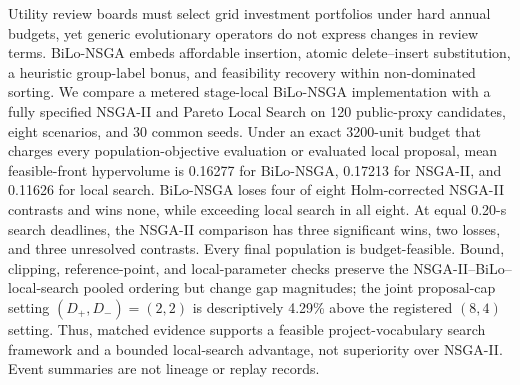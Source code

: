 Utility review boards must select grid investment portfolios under hard annual budgets, yet generic evolutionary operators do not express changes in review terms. BiLo-NSGA embeds affordable insertion, atomic delete--insert substitution, a heuristic group-label bonus, and feasibility recovery within non-dominated sorting. We compare a metered stage-local BiLo-NSGA implementation with a fully specified NSGA-II and Pareto Local Search on 120 public-proxy candidates, eight scenarios, and 30 common seeds. Under an exact 3200-unit budget that charges every population-objective evaluation or evaluated local proposal, mean feasible-front hypervolume is 0.16277 for BiLo-NSGA, 0.17213 for NSGA-II, and 0.11626 for local search. BiLo-NSGA loses four of eight Holm-corrected NSGA-II contrasts and wins none, while exceeding local search in all eight. At equal 0.20-s search deadlines, the NSGA-II comparison has three significant wins, two losses, and three unresolved contrasts. Every final population is budget-feasible. Bound, clipping, reference-point, and local-parameter checks preserve the NSGA-II--BiLo--local-search pooled ordering but change gap magnitudes; the joint proposal-cap setting \((D_+,D_-)=(2,2)\) is descriptively 4.29\% above the registered \((8,4)\) setting. Thus, matched evidence supports a feasible project-vocabulary search framework and a bounded local-search advantage, not superiority over NSGA-II. Event summaries are not lineage or replay records.

